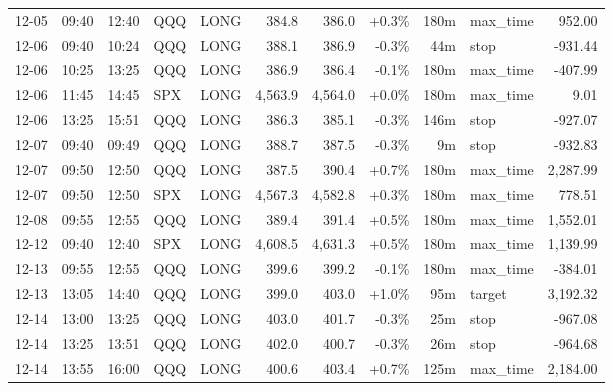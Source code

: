 \documentclass[11pt,a4paper,twoside]{article}
\begin{document}
\begin{center}
\begin{longtable}{>{\color{txtmain}}l l l l l r r r r >{\color{txtmain}}l r}
12-05 & 09:40 & 12:40 & QQQ & LONG & 384.8 & 386.0 & \textcolor{wingreen}{+0.3\%} & 180m & max\_time & \textcolor{wingreen}{952.00} \\
12-06 & 09:40 & 10:24 & QQQ & LONG & 388.1 & 386.9 & \textcolor{lossred}{-0.3\%} & 44m & stop & \textcolor{lossred}{-931.44} \\
12-06 & 10:25 & 13:25 & QQQ & LONG & 386.9 & 386.4 & \textcolor{lossred}{-0.1\%} & 180m & max\_time & \textcolor{lossred}{-407.99} \\
12-06 & 11:45 & 14:45 & SPX & LONG & 4,563.9 & 4,564.0 & \textcolor{wingreen}{+0.0\%} & 180m & max\_time & \textcolor{wingreen}{9.01} \\
12-06 & 13:25 & 15:51 & QQQ & LONG & 386.3 & 385.1 & \textcolor{lossred}{-0.3\%} & 146m & stop & \textcolor{lossred}{-927.07} \\
12-07 & 09:40 & 09:49 & QQQ & LONG & 388.7 & 387.5 & \textcolor{lossred}{-0.3\%} & 9m & stop & \textcolor{lossred}{-932.83} \\
12-07 & 09:50 & 12:50 & QQQ & LONG & 387.5 & 390.4 & \textcolor{wingreen}{+0.7\%} & 180m & max\_time & \textcolor{wingreen}{2,287.99} \\
12-07 & 09:50 & 12:50 & SPX & LONG & 4,567.3 & 4,582.8 & \textcolor{wingreen}{+0.3\%} & 180m & max\_time & \textcolor{wingreen}{778.51} \\
12-08 & 09:55 & 12:55 & QQQ & LONG & 389.4 & 391.4 & \textcolor{wingreen}{+0.5\%} & 180m & max\_time & \textcolor{wingreen}{1,552.01} \\
12-12 & 09:40 & 12:40 & SPX & LONG & 4,608.5 & 4,631.3 & \textcolor{wingreen}{+0.5\%} & 180m & max\_time & \textcolor{wingreen}{1,139.99} \\
12-13 & 09:55 & 12:55 & QQQ & LONG & 399.6 & 399.2 & \textcolor{lossred}{-0.1\%} & 180m & max\_time & \textcolor{lossred}{-384.01} \\
12-13 & 13:05 & 14:40 & QQQ & LONG & 399.0 & 403.0 & \textcolor{wingreen}{+1.0\%} & 95m & target & \textcolor{wingreen}{3,192.32} \\
12-14 & 13:00 & 13:25 & QQQ & LONG & 403.0 & 401.7 & \textcolor{lossred}{-0.3\%} & 25m & stop & \textcolor{lossred}{-967.08} \\
12-14 & 13:25 & 13:51 & QQQ & LONG & 402.0 & 400.7 & \textcolor{lossred}{-0.3\%} & 26m & stop & \textcolor{lossred}{-964.68} \\
12-14 & 13:55 & 16:00 & QQQ & LONG & 400.6 & 403.4 & \textcolor{wingreen}{+0.7\%} & 125m & max\_time & \textcolor{wingreen}{2,184.00} \\

\end{longtable}
\end{center}
\end{document}
